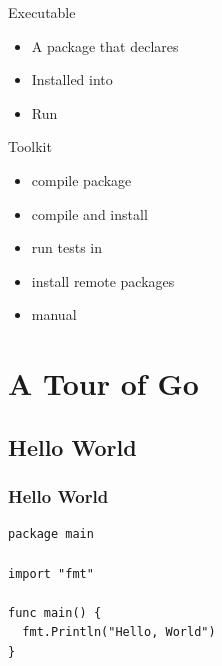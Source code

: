 \documentclass[xetex,mathserif,serif,12pt]{beamer}
\begin{document}
\begin{frame}{Executable}
  \begin{itemize}[<+->]
  \item A package that declares 
  \item Installed into 
  \item Run 
  \end{itemize}
\end{frame}

\begin{frame}{Toolkit}
  \begin{itemize}[<+->]
  \item {} compile package
  \item {} compile and install
  \item {} run tests in 
  \item {} install remote packages
  \item {} manual
  \end{itemize}
\end{frame}

\section{A Tour of Go}
\label{sec:tour}


\subsection{Hello World}
\begin{frame}[fragile]
  \frametitle{Hello World}

  \begin{beamer@nomargin}
    \begin{lstlisting}[basicstyle=\small\ttfamily]
package main

import "fmt"

func main() {
  fmt.Println("Hello, World")
}
    \end{lstlisting}
  \end{beamer@nomargin}
\end{frame}
\end{document}
